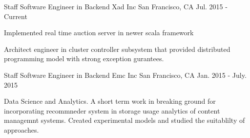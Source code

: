 

\begin{cventries}

  \cventry
    {Staff Software Engineer in Backend } %
    {Xad Inc} %
    {San Francisco, CA} %
    {Jul. 2015 - Current} %
    {
      \begin{cvitems} %
        \item {Implemented real time auction server in newer scala framework} 
        \item {Architect engineer in cluster controller subsystem that provided distributed programming model with strong exception gurantees.}
      \end{cvitems}
    }

  \cventry
    {Staff Software Engineer in Backend } %
    {Emc Inc} %
    {San Francisco, CA} %
    {Jan. 2015 - July. 2015} %
    {
      \begin{cvitems} %
        \item {Data Science and Analytics. A short term work in  breaking ground for incorporating recommneder system in storage usage analytics of content managemnt systems. Created experimental models and studied the suitablilty of approaches.}
      \end{cvitems}
    }




\end{cventries}
